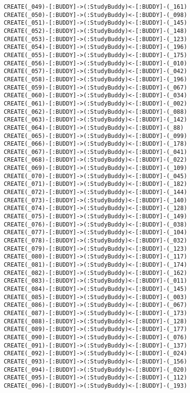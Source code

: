 \begin{lstlisting}
	CREATE(_049)-[:BUDDY]->(:StudyBuddy)<-[:BUDDY]-(_161)
	CREATE(_050)-[:BUDDY]->(:StudyBuddy)<-[:BUDDY]-(_098)
	CREATE(_051)-[:BUDDY]->(:StudyBuddy)<-[:BUDDY]-(_145)
	CREATE(_052)-[:BUDDY]->(:StudyBuddy)<-[:BUDDY]-(_148)
	CREATE(_053)-[:BUDDY]->(:StudyBuddy)<-[:BUDDY]-(_123)
	CREATE(_054)-[:BUDDY]->(:StudyBuddy)<-[:BUDDY]-(_196)
	CREATE(_055)-[:BUDDY]->(:StudyBuddy)<-[:BUDDY]-(_175)
	CREATE(_056)-[:BUDDY]->(:StudyBuddy)<-[:BUDDY]-(_010)
	CREATE(_057)-[:BUDDY]->(:StudyBuddy)<-[:BUDDY]-(_042)
	CREATE(_058)-[:BUDDY]->(:StudyBuddy)<-[:BUDDY]-(_196)
	CREATE(_059)-[:BUDDY]->(:StudyBuddy)<-[:BUDDY]-(_067)
	CREATE(_060)-[:BUDDY]->(:StudyBuddy)<-[:BUDDY]-(_034)
	CREATE(_061)-[:BUDDY]->(:StudyBuddy)<-[:BUDDY]-(_002)
	CREATE(_062)-[:BUDDY]->(:StudyBuddy)<-[:BUDDY]-(_088)
	CREATE(_063)-[:BUDDY]->(:StudyBuddy)<-[:BUDDY]-(_142)
	CREATE(_064)-[:BUDDY]->(:StudyBuddy)<-[:BUDDY]-(_88)
	CREATE(_065)-[:BUDDY]->(:StudyBuddy)<-[:BUDDY]-(_099)
	CREATE(_066)-[:BUDDY]->(:StudyBuddy)<-[:BUDDY]-(_178)
	CREATE(_067)-[:BUDDY]->(:StudyBuddy)<-[:BUDDY]-(_041)
	CREATE(_068)-[:BUDDY]->(:StudyBuddy)<-[:BUDDY]-(_022)
	CREATE(_069)-[:BUDDY]->(:StudyBuddy)<-[:BUDDY]-(_109)
	CREATE(_070)-[:BUDDY]->(:StudyBuddy)<-[:BUDDY]-(_045)
	CREATE(_071)-[:BUDDY]->(:StudyBuddy)<-[:BUDDY]-(_182)
	CREATE(_072)-[:BUDDY]->(:StudyBuddy)<-[:BUDDY]-(_144)
	CREATE(_073)-[:BUDDY]->(:StudyBuddy)<-[:BUDDY]-(_140)
	CREATE(_074)-[:BUDDY]->(:StudyBuddy)<-[:BUDDY]-(_128)
	CREATE(_075)-[:BUDDY]->(:StudyBuddy)<-[:BUDDY]-(_149)
	CREATE(_076)-[:BUDDY]->(:StudyBuddy)<-[:BUDDY]-(_038)
	CREATE(_077)-[:BUDDY]->(:StudyBuddy)<-[:BUDDY]-(_104)
	CREATE(_078)-[:BUDDY]->(:StudyBuddy)<-[:BUDDY]-(_032)
	CREATE(_079)-[:BUDDY]->(:StudyBuddy)<-[:BUDDY]-(_123)
	CREATE(_080)-[:BUDDY]->(:StudyBuddy)<-[:BUDDY]-(_117)
	CREATE(_081)-[:BUDDY]->(:StudyBuddy)<-[:BUDDY]-(_174)
	CREATE(_082)-[:BUDDY]->(:StudyBuddy)<-[:BUDDY]-(_162)
	CREATE(_083)-[:BUDDY]->(:StudyBuddy)<-[:BUDDY]-(_011)
	CREATE(_084)-[:BUDDY]->(:StudyBuddy)<-[:BUDDY]-(_145)
	CREATE(_085)-[:BUDDY]->(:StudyBuddy)<-[:BUDDY]-(_003)
	CREATE(_086)-[:BUDDY]->(:StudyBuddy)<-[:BUDDY]-(_067)
	CREATE(_087)-[:BUDDY]->(:StudyBuddy)<-[:BUDDY]-(_173)
	CREATE(_088)-[:BUDDY]->(:StudyBuddy)<-[:BUDDY]-(_128)
	CREATE(_089)-[:BUDDY]->(:StudyBuddy)<-[:BUDDY]-(_177)
	CREATE(_090)-[:BUDDY]->(:StudyBuddy)<-[:BUDDY]-(_076)
	CREATE(_091)-[:BUDDY]->(:StudyBuddy)<-[:BUDDY]-(_137)
	CREATE(_092)-[:BUDDY]->(:StudyBuddy)<-[:BUDDY]-(_024)
	CREATE(_093)-[:BUDDY]->(:StudyBuddy)<-[:BUDDY]-(_156)
	CREATE(_094)-[:BUDDY]->(:StudyBuddy)<-[:BUDDY]-(_020)
	CREATE(_095)-[:BUDDY]->(:StudyBuddy)<-[:BUDDY]-(_112)
	CREATE(_096)-[:BUDDY]->(:StudyBuddy)<-[:BUDDY]-(_193)

\end{lstlisting}

